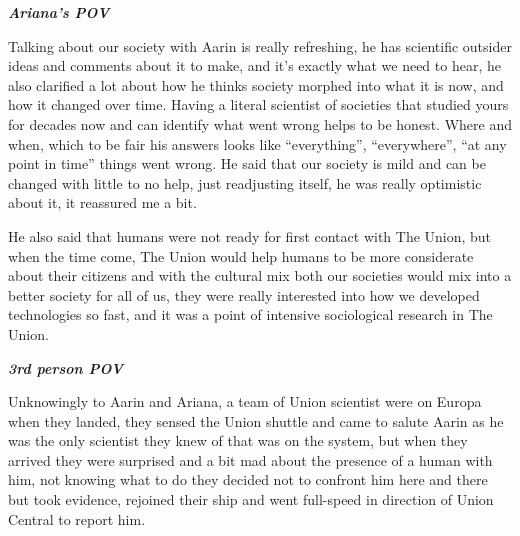 \documentclass[colorlinks,12pt,a4paper]{book}
\begin{document}
\textit{\textbf{Ariana's POV}}\par
\bigskip

Talking about our society with Aarin is really refreshing, he has scientific outsider ideas and comments about 
it to make, and it's exactly what we need to hear, he also clarified a lot about how he thinks society morphed into
 what it is now, and how it changed over time. Having a literal scientist of societies that studied yours
  for decades now and can identify what went wrong helps to be honest. Where and when, which to be fair his answers looks like “everything”,
  “everywhere”, “at any point in time” things went wrong. He said that our society is mild and can be changed with little to no help,
   just readjusting itself, he was really optimistic about it, it reassured me a bit.\par
   \bigskip

He also said that humans were not ready for first contact with The Union, but when the time come, 
The Union would help humans to be more considerate about their citizens and with the cultural mix both our societies 
would mix into a better society for all of us, they were really interested into how we developed technologies so fast,
 and it was a point of intensive sociological research in The Union.\par
 \bigskip

\textit{\textbf{3rd person POV}}\par
\bigskip

Unknowingly to Aarin and Ariana, a team of Union scientist were on Europa when they landed,
 they sensed the Union shuttle and came to salute Aarin as he was the only scientist they knew of that was on the system, 
 but when they arrived they were surprised and a bit mad about the presence of a human with him, 
 not knowing what to do they decided not to confront him here and there but took evidence, rejoined their ship and 
 went full-speed in direction of Union Central to report him.\par
 \bigskip


\printglossaries
\end{document}
